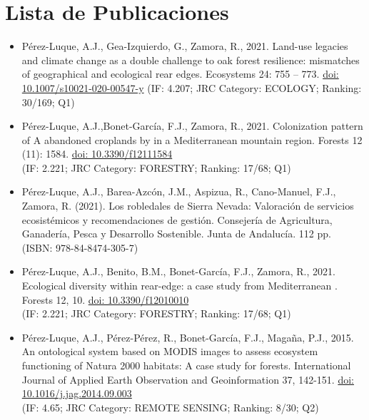 %
\pagestyle{empty}
\hfill

\section*{Lista de Publicaciones}

\footnotesize{
\begin{itemize}
    \item Pérez-Luque, A.J., Gea-Izquierdo, G., Zamora, R., 2021. Land-use legacies and climate change as a double challenge to oak forest resilience: mismatches of geographical and ecological rear edges. Ecosystems 24: 755 – 773. \href{https://doi.org/10.1007/s10021-020-00547-y}{doi: 10.1007/s10021-020-00547-y}
    (IF: 4.207; JRC Category: ECOLOGY; Ranking: 30/169; Q1)
    \item Pérez-Luque, A.J.,Bonet-García, F.J., Zamora, R., 2021. Colonization pattern of A
    abandoned croplands by \Qpy in a Mediterranean mountain region. Forests 12 (11): 1584. \href{https://doi.org/10.3390/f12111584}{doi: 10.3390/f12111584} \\ 
    (IF: 2.221; JRC Category: FORESTRY; Ranking: 17/68; Q1) 
    \item Pérez-Luque, A.J., Barea-Azcón, J.M., Aspizua, R., Cano-Manuel, F.J., Zamora, R. (2021). Los robledales de Sierra Nevada: Valoración de servicios ecosistémicos y recomendaciones de gestión. Consejería de Agricultura, Ganadería, Pesca y Desarrollo Sostenible. Junta de Andalucía. 112 pp.\\ 
    (ISBN: 978-84-8474-305-7) 
    \item Pérez-Luque, A.J., Benito, B.M., Bonet-García, F.J., Zamora, R., 2021. Ecological diversity within rear-edge: a case study from Mediterranean \Qpw. Forests 12, 10. \href{https://doi.org/10.3390/f12010010}{doi: 10.3390/f12010010} \\ 
    (IF: 2.221; JRC Category: FORESTRY; Ranking: 17/68; Q1) 
    \item Pérez-Luque, A.J., Pérez-Pérez, R., Bonet-García, F.J., Magaña, P.J., 2015. An ontological system based on MODIS images to assess ecosystem functioning of Natura 2000 habitats: A case study for \Qpy forests. International Journal of Applied Earth Observation and Geoinformation 37, 142-151. \href{https://doi.org/10.1016/j.jag.2014.09.003}{doi: 10.1016/j.jag.2014.09.003} \\
    (IF: 4.65; JRC Category: REMOTE SENSING; Ranking: 8/30; Q2)

\end{itemize}}
